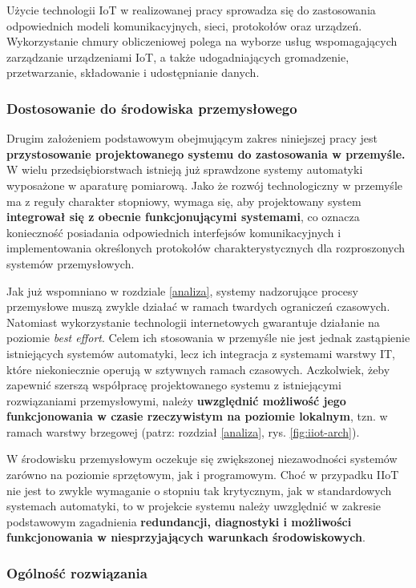 \documentclass[a4paper, 12pt, twoside]{article}
\begin{document}
Użycie technologii IoT
w realizowanej pracy sprowadza się do zastosowania odpowiednich modeli komunikacyjnych,
sieci, protokołów oraz urządzeń. Wykorzystanie chmury obliczeniowej polega
na wyborze usług wspomagających zarządzanie urządzeniami IoT,
a także udogadniających gromadzenie, przetwarzanie, składowanie i udostępnianie
danych.

\subsubsection{Dostosowanie do środowiska przemysłowego}

Drugim założeniem podstawowym obejmującym zakres niniejszej pracy
jest \textbf{przystosowanie projektowanego systemu do zastosowania w przemyśle.}
W wielu przedsiębiorstwach istnieją już sprawdzone systemy automatyki wyposażone
w aparaturę pomiarową. Jako że rozwój technologiczny w przemyśle ma z reguły
charakter stopniowy, wymaga się, aby projektowany system \textbf{integrował się
      z obecnie funkcjonującymi systemami}, co oznacza konieczność posiadania
odpowiednich interfejsów komunikacyjnych i implementowania określonych protokołów
charakterystycznych dla rozproszonych systemów przemysłowych.

Jak już wspomniano w rozdziale \ref{analiza}, systemy nadzorujące
procesy przemysłowe muszą zwykle działać w ramach twardych ograniczeń czasowych.
Natomiast wykorzystanie technologii internetowych gwarantuje działanie na poziomie
\emph{best effort}. Celem ich stosowania w przemyśle nie jest jednak zastąpienie
istniejących systemów automatyki, lecz ich integracja z systemami warstwy IT,
które niekoniecznie operują w sztywnych ramach czasowych.
Aczkolwiek, żeby zapewnić szerszą współpracę projektowanego systemu
z istniejącymi rozwiązaniami przemysłowymi, należy \textbf{uwzględnić możliwość jego funkcjonowania
      w czasie rzeczywistym na poziomie lokalnym}, tzn. w ramach warstwy brzegowej
(patrz: rozdział \ref{analiza}, rys. \ref{fig:iiot-arch}).

W środowisku przemysłowym oczekuje się zwiększonej niezawodności systemów
zarówno na poziomie sprzętowym, jak i programowym. Choć w przypadku IIoT nie jest
to zwykle wymaganie o stopniu tak krytycznym, jak w standardowych systemach automatyki,
to w projekcie systemu należy uwzględnić w zakresie podstawowym
zagadnienia \textbf{redundancji, diagnostyki i możliwości funkcjonowania w niesprzyjających
      warunkach środowiskowych}.

\subsubsection{Ogólność rozwiązania}
\end{document}
